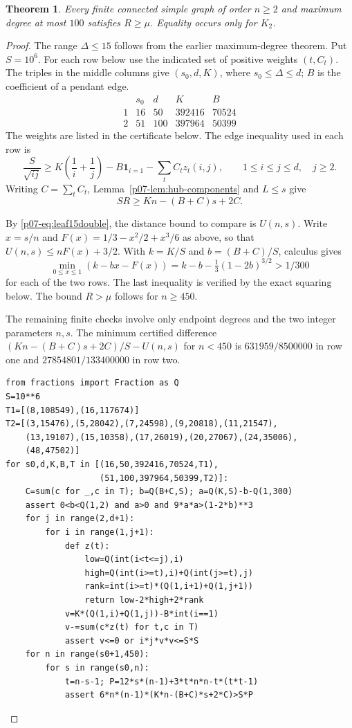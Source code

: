 \documentclass[11pt,a4paper]{article}
\newtheorem{theorem}{Theorem}[section]
\begin{document}
\begin{theorem}\label{p07-thm:degree100}
Every finite connected simple graph of order $n\ge2$ and maximum degree at most $100$ satisfies $R\ge\mu$. Equality occurs only for $K_2$.
\end{theorem}
\begin{proof}
The range $\Delta\le15$ follows from the earlier maximum-degree theorem. Put $S=10^6$. For each row below use the indicated set of positive weights $(t,C_t)$. The triples in the middle columns give $(s_0,d,K)$, where $s_0\le\Delta\le d$; $B$ is the coefficient of a pendant edge.
\[
\begin{array}{c|r|r|r|r}
 &s_0&d&K&B\\ \hline
 1&16&50&392416&70524\\
 2&51&100&397964&50399
\end{array}
\]
The weights are listed in the certificate below. The edge inequality used in each row is
\[
 \frac{S}{\sqrt{ij}}\ge K\left(\frac1i+\frac1j\right)-B\mathbf1_{i=1}
           -\sum_t C_tz_t(i,j),\qquad 1\le i\le j\le d,\quad j\ge2.
\]
Writing $C=\sum_t C_t$, Lemma~\ref{p07-lem:hub-components} and $L\le s$ give
\[
 SR\ge Kn-(B+C)s+2C.
\]

By \eqref{p07-eq:leaf15double}, the distance bound to compare is $U(n,s)$.
Write $x=s/n$ and $F(x)=1/3-x^2/2+x^3/6$ as above, so that
$U(n,s)\le nF(x)+3/2$.
With $k=K/S$ and $b=(B+C)/S$, calculus gives
\[
 \min_{0\le x\le1}(k-bx-F(x))=k-b-\tfrac13(1-2b)^{3/2}>1/300
\]
for each of the two rows. The last inequality is verified by the exact squaring below. The bound $R>\mu$ follows for $n\ge450$.

The remaining finite checks involve only endpoint degrees and the two integer parameters $n,s$. The minimum certified difference $(Kn-(B+C)s+2C)/S-U(n,s)$ for $n<450$ is $631959/8500000$ in row one and $27854801/133400000$ in row two.
\begin{verbatim}
from fractions import Fraction as Q
S=10**6
T1=[(8,108549),(16,117674)]
T2=[(3,15476),(5,28042),(7,24598),(9,20818),(11,21547),
    (13,19107),(15,10358),(17,26019),(20,27067),(24,35006),
    (48,47502)]
for s0,d,K,B,T in [(16,50,392416,70524,T1),
                   (51,100,397964,50399,T2)]:
    C=sum(c for _,c in T); b=Q(B+C,S); a=Q(K,S)-b-Q(1,300)
    assert 0<b<Q(1,2) and a>0 and 9*a*a>(1-2*b)**3
    for j in range(2,d+1):
        for i in range(1,j+1):
            def z(t):
                low=Q(int(i<t<=j),i)
                high=Q(int(i>=t),i)+Q(int(j>=t),j)
                rank=int(i>=t)*(Q(1,i+1)+Q(1,j+1))
                return low-2*high+2*rank
            v=K*(Q(1,i)+Q(1,j))-B*int(i==1)
            v-=sum(c*z(t) for t,c in T)
            assert v<=0 or i*j*v*v<=S*S
    for n in range(s0+1,450):
        for s in range(s0,n):
            t=n-s-1; P=12*s*(n-1)+3*t*n*n-t*(t*t-1)
            assert 6*n*(n-1)*(K*n-(B+C)*s+2*C)>S*P
\end{verbatim}
\end{proof}
\end{document}
